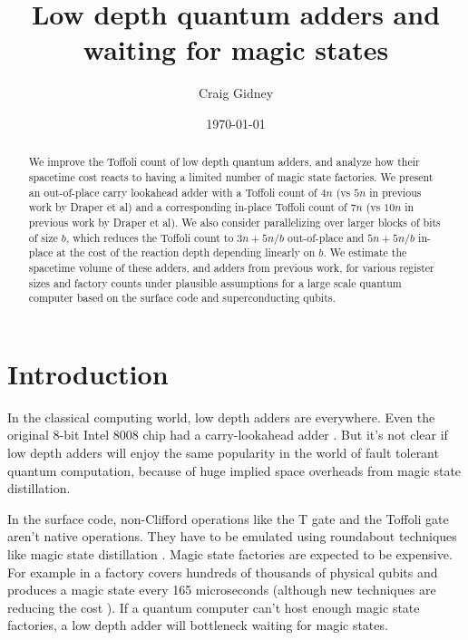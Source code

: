 \documentclass[onecolumn,unpublished]{quantumarticle}
\title{Low depth quantum adders and waiting for magic states}
\date{\today}
\author{Craig Gidney}
\affiliation{Google Inc., Santa Barbara, California 93117, USA}
\theoremstyle{definition}
\theoremstyle{definition}
\theoremstyle{definition}
\begin{document}
\maketitle

\begin{abstract}
    We improve the Toffoli count of low depth quantum adders, and analyze how their spacetime cost reacts to having a limited number of magic state factories.
    We present an out-of-place carry lookahead adder with a Toffoli count of $4n$ (vs $5n$ in previous work by Draper et al) and a corresponding in-place Toffoli count of $7n$ (vs $10n$ in previous work by Draper et al).
    We also consider parallelizing over larger blocks of bits of size $b$, which reduces the Toffoli count to $3n + 5n/b$ out-of-place and $5n + 5n/b$ in-place at the cost of the reaction depth depending linearly on $b$.
    We estimate the spacetime volume of these adders, and adders from previous work, for various register sizes and factory counts under plausible assumptions for a large scale quantum computer based on the surface code and superconducting qubits.
\end{abstract}

\section{Introduction}

In the classical computing world, low depth adders are everywhere.
Even the original 8-bit Intel 8008 chip had a carry-lookahead adder \cite{shirriff2020reverseengineer8008}.
But it's not clear if low depth adders will enjoy the same popularity in the world of fault tolerant quantum computation, because of huge implied space overheads from magic state distillation.

In the surface code, non-Clifford operations like the T gate and the Toffoli gate aren't native operations.
They have to be emulated using roundabout techniques like magic state distillation \cite{bravyi2005magicstate}.
Magic state factories are expected to be expensive.
For example in \cite{gidney2019catalyzed} a factory covers hundreds of thousands of physical qubits and produces a magic state every 165 microseconds (although new techniques are reducing the cost \cite{litinski2019magicnotcostly}).
If a quantum computer can't host enough magic state factories, a low depth adder will bottleneck waiting for magic states.
\end{document}
